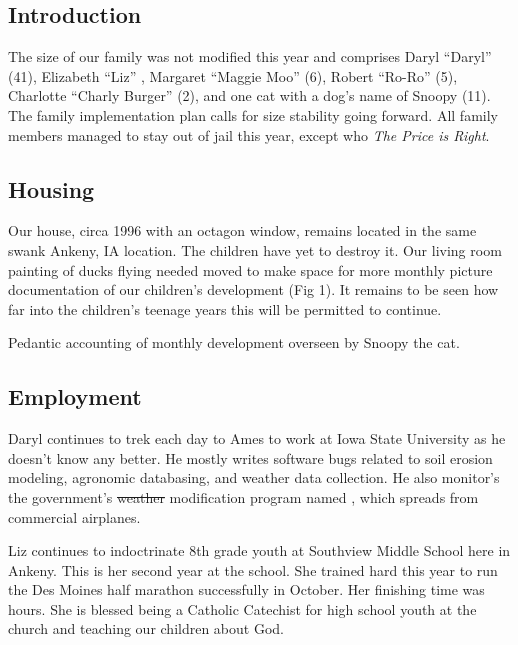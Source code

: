 \documentclass[letterpaper,11pt]{article}
\makeatletter
\newenvironment{figurehere}
  {\def\@captype{figure}}
  {}
\makeatother
\begin{document}
\begin{multicols}{2}

    
\section{Introduction} 

The size of our family was not modified this year and comprises Daryl
\enquote{Daryl} (41), Elizabeth \enquote{Liz} ,
Margaret \enquote{Maggie Moo} (6), Robert \enquote{Ro-Ro} (5), Charlotte
 \enquote{Charly Burger} (2), and one cat with a dog's name of Snoopy (11). 
The family implementation plan calls for size stability going forward.  All
family members managed to stay out of jail this year, except 
who  
\textit{The Price is Right}. 

   
\subsection{Housing}

Our house, circa 1996 with an octagon window, remains located in the same
swank Ankeny, IA location.  The children have yet to destroy it. Our living
room painting of ducks flying needed moved to make space for more monthly
picture documentation of our children's development (Fig 1).  It remains to
be seen how far into the children's teenage years this will be permitted
to continue.

\bigskip

\begin{figurehere}
    \centering   
    \caption{Pedantic accounting of monthly development overseen by Snoopy the cat.}
   \end{figurehere}


\subsection{Employment}

Daryl continues to trek each day to Ames to work at Iowa State University as
he doesn't know any better.  He mostly writes software bugs 
related to soil erosion modeling, agronomic databasing, and weather data
collection.  He also monitor's the government's \sout{weather} modification program
named , which spreads  from commercial
airplanes.

Liz continues to indoctrinate 8th grade youth at Southview Middle School
here in Ankeny.  This is her second year at the school.  She trained hard this
year to run the Des Moines half marathon successfully in October.  Her finishing
time was  hours. She is blessed
being a Catholic Catechist for high school youth at the church and teaching our
children about God.


\end{multicols}
\end{document}
